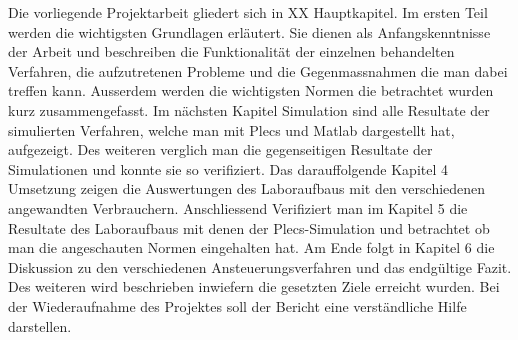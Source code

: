 Die vorliegende Projektarbeit gliedert sich in XX Hauptkapitel. Im ersten Teil werden die wichtigsten Grundlagen erläutert. Sie dienen als Anfangskenntnisse der Arbeit und beschreiben die Funktionalität der einzelnen behandelten Verfahren, die aufzutretenen Probleme und die Gegenmassnahmen die man dabei treffen kann. Ausserdem werden die wichtigsten Normen die betrachtet wurden kurz zusammengefasst. Im nächsten Kapitel Simulation sind alle Resultate der simulierten Verfahren, welche man mit Plecs und Matlab dargestellt hat, aufgezeigt. Des weiteren verglich man die gegenseitigen Resultate der Simulationen und konnte sie so verifiziert. Das darauffolgende Kapitel 4 Umsetzung zeigen die Auswertungen des Laboraufbaus mit den verschiedenen angewandten Verbrauchern. Anschliessend Verifiziert man im Kapitel 5 die Resultate des Laboraufbaus mit denen der Plecs-Simulation und betrachtet ob man die angeschauten Normen eingehalten hat. Am Ende folgt in Kapitel 6 die Diskussion zu den verschiedenen Ansteuerungsverfahren und das endgültige Fazit. Des weiteren wird beschrieben inwiefern die gesetzten Ziele erreicht wurden. Bei der Wiederaufnahme des Projektes soll der Bericht eine verständliche Hilfe darstellen.  




















